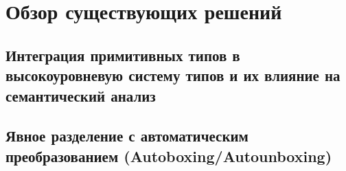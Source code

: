\section{Обзор существующих решений}
\label{sec:Chapter2} 

\subsection*{Интеграция примитивных типов в высокоуровневую систему типов и их влияние на семантический анализ}

\subsection{Явное разделение с автоматическим преобразованием (Autoboxing/Autounboxing)}

